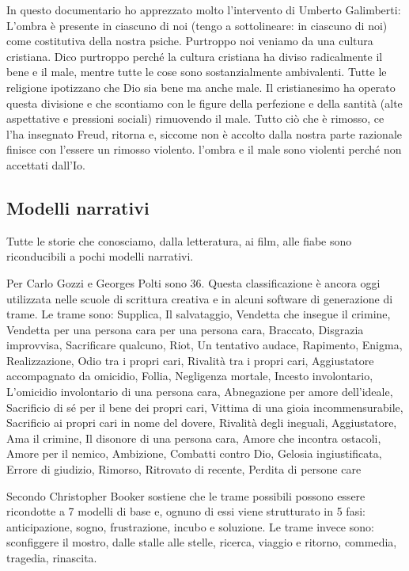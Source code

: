 In questo documentario ho apprezzato molto
l'intervento di Umberto Galimberti: L'ombra è presente in ciascuno di noi
(tengo a sottolineare: in ciascuno di noi) come costitutiva della nostra psiche. Purtroppo noi veniamo da una cultura
cristiana. Dico purtroppo perché la cultura cristiana ha diviso radicalmente il bene e il male, mentre tutte le cose
sono sostanzialmente ambivalenti. Tutte le religione ipotizzano che Dio sia bene ma anche male. Il cristianesimo ha
operato questa divisione e che scontiamo con le figure della perfezione e della santità (alte aspettative e pressioni
sociali) rimuovendo il male. Tutto ciò che è rimosso, ce l'ha insegnato Freud, ritorna e, siccome
non è accolto dalla nostra parte razionale finisce con l'essere un rimosso violento.
l'ombra e il male sono violenti perché non accettati dall'Io.

\subsection{Modelli narrativi}
Tutte le storie che conosciamo, dalla letteratura, ai film, alle fiabe sono riconducibili a pochi modelli narrativi. 

Per Carlo Gozzi e Georges Polti sono 36. Questa classificazione è ancora oggi utilizzata nelle scuole di scrittura
creativa e in alcuni software di generazione di trame. Le trame sono: Supplica, Il salvataggio, Vendetta che insegue il
crimine, Vendetta per una persona cara per una persona cara, Braccato, Disgrazia improvvisa, Sacrificare qualcuno,
Riot, Un tentativo audace, Rapimento, Enigma, Realizzazione, Odio tra i propri cari, Rivalità tra i propri cari,
Aggiustatore accompagnato da omicidio, Follia, Negligenza mortale, Incesto involontario, L'omicidio involontario di una
persona cara, Abnegazione per amore dell'ideale, Sacrificio di sé per il bene dei propri cari, Vittima di una gioia
incommensurabile, Sacrificio ai propri cari in nome del dovere, Rivalità degli ineguali, Aggiustatore, Ama il crimine,
Il disonore di una persona cara, Amore che incontra ostacoli, Amore per il nemico, Ambizione, Combatti contro Dio,
Gelosia ingiustificata, Errore di giudizio, Rimorso, Ritrovato di recente, Perdita di persone care 


\bigskip

Secondo Christopher Booker sostiene che le trame possibili possono essere ricondotte a 7 modelli di base e, ognuno di
essi viene strutturato in 5 fasi: anticipazione, sogno, frustrazione, incubo e soluzione. Le trame invece sono:
sconfiggere il mostro, dalle stalle alle stelle, ricerca, viaggio e ritorno, commedia, tragedia, rinascita.

